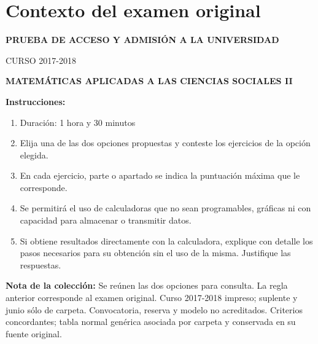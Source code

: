 \section*{Contexto del examen original}
\textbf{PRUEBA DE ACCESO Y ADMISIÓN A LA UNIVERSIDAD}\par
CURSO 2017-2018\par
\textbf{MATEMÁTICAS APLICADAS A LAS CIENCIAS SOCIALES II}

\textbf{Instrucciones:}
\begin{enumerate}[label=\textbf{\alph*)}]
  \item Duración: 1 hora y 30 minutos
  \item Elija una de las dos opciones propuestas y conteste los ejercicios de la opción elegida.
  \item En cada ejercicio, parte o apartado se indica la puntuación máxima que le corresponde.
  \item Se permitirá el uso de calculadoras que no sean programables, gráficas ni con capacidad para almacenar o transmitir datos.
  \item Si obtiene resultados directamente con la calculadora, explique con detalle los pasos necesarios para su obtención sin el uso de la misma. Justifique las respuestas.
\end{enumerate}
\noindent\textbf{Nota de la colección:} Se reúnen las dos opciones para consulta. La regla anterior corresponde al examen original. Curso 2017-2018 impreso; suplente y junio sólo de carpeta. Convocatoria, reserva y modelo no acreditados. Criterios concordantes; tabla normal genérica asociada por carpeta y conservada en su fuente original.
\par\medskip
